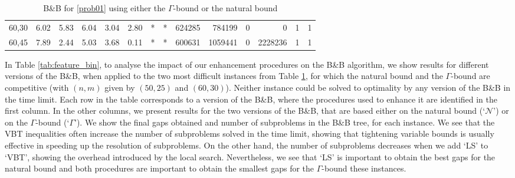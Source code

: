 \documentclass[smallextended]{svjour3hack}       %
\begin{document}
\begin{table}[!ht]
\begin{tabular}{l|rrr|rr|rr|rr|rr|rr}
60,30                                               & 6.02                              & 5.83                         & 6.04                     & 3.04                              & 2.80                          & *                                 & *                             & 624285                             & 784199                        & 0                                       & 0                                  & 1                                 & 1                            \\
60,45                                               & 7.89                              & 2.44                         & 5.03                     & 3.68                              & 0.11                          & *                                 & *                             & 600631                             & 1059441                       & 0                                       & 2228236                            & 1                                 & 1                           
\end{tabular}
\caption{B\&B for \ref{prob01} using either the $\Gamma$-bound or the natural bound}\label{tab:bb_bin_onebound}
\end{table}

In Table \ref{tab:feature_bin}, to analyse the impact of our enhancement procedures on the B\&B algorithm, we show  results for different versions of the B\&B, when applied to the two most difficult instances from Table \ref{tab:bb_bin_onebound}, for which the natural bound and the $\Gamma$-bound  are competitive (with  $(n,m)$ given by $(50,25)$ and $(60,30)$).
 Neither instance could  be solved to optimality by any version of the B\&B in the time limit. Each row in the table corresponds to a version of the B\&B, where the procedures used to enhance it are identified in the first column. In the other columns, we  present results for the two versions of the  B\&B, that are based either on the natural bound (`$\mathcal{N}$') or on the $\Gamma$-bound (`$\Gamma$').   We show  the final gaps obtained  and number of subproblems in the B\&B tree,  for  each instance. We see that the VBT inequalities often increase  the number of subproblems solved in the time limit, showing that tightening variable bounds is usually effective in speeding up the resolution of subproblems. On the other hand, the number of subproblems decreases when we add  `LS' to `VBT', showing the overhead  introduced by the local search. Nevertheless, we see that `LS' is important to obtain the best gaps for the natural bound  and both procedures are important  to obtain  the smallest gaps for the $\Gamma$-bound these instances. 
\end{document}
